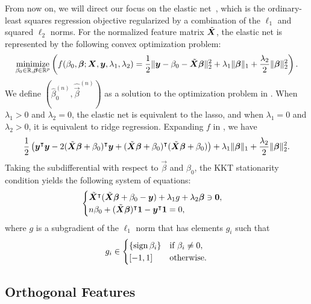 From now on, we will direct our focus on the elastic net~\citep{zou2005}, which is the
ordinary-least squares regression objective regularized by a combination of the \(\ell_1\)
and squared \(\ell_2\) norms. For the normalized feature matrix \(\tilde{\boldsymbol{X}}\), the
elastic net is represented by the following convex optimization problem:
\begin{equation}
  \label{eq:elastic-net}
  \operatorname*{minimize}_{\beta_0 \in \mathbb{R},\boldsymbol{\beta} \in \mathbb{R}^p}\left( f(\beta_0, \boldsymbol{\beta};\boldsymbol{X},\boldsymbol{y},\lambda_1,\lambda_2)=\frac{1}{2} \lVert \boldsymbol y - \beta_0 - \tilde{\boldsymbol{X}}\boldsymbol{\beta} \rVert^2_2  + \lambda_1 \lVert \boldsymbol\beta \rVert_1 + \frac{\lambda_2}{2}\lVert \boldsymbol \beta \rVert_2^2\right).
\end{equation}
We define \((\hat{\beta}_0^{(n)}, \hat{\vec{\beta}}^{(n)})\) as a solution to the optimization problem in .
When \(\lambda_1 > 0\) and \(\lambda_2 = 0\), the elastic net is equivalent to the lasso, and when \(\lambda_1 = 0\) and \(\lambda_2 > 0\), it is equivalent to ridge regression. Expanding \(f\) in , we have
\[
  \begin{aligned}
    \frac{1}{2}\left( \boldsymbol y^\intercal \boldsymbol y - 2(\tilde{\boldsymbol{X}}\boldsymbol{\beta} + \beta_0)^\intercal\boldsymbol{y} + (\tilde{\boldsymbol{X}}\boldsymbol{\beta} + \beta_0)^\intercal(\tilde{\boldsymbol{X}}\boldsymbol{\beta} + \beta_0)\right) + \lambda_1 \lVert \boldsymbol\beta \rVert_1 + \frac{\lambda_2}{2}\lVert \boldsymbol \beta \rVert_2^2.
  \end{aligned}
\]
Taking the subdifferential with respect to \(\vec{\beta}\) and \(\beta_0\), the KKT
stationarity condition yields the following system of equations:
\begin{equation}
  \label{eq:kkt-elasticnet}
  \begin{cases}
    \tilde{\boldsymbol{X}}^\intercal(\tilde{\boldsymbol{X}}\boldsymbol{\beta} + \beta_0 - \boldsymbol{y}) + \lambda_1 g + \lambda_2 \boldsymbol\beta \ni \boldsymbol{0}, \\
    n \beta_0 + (\tilde{\boldsymbol{X}}\boldsymbol{\beta})^\intercal \boldsymbol{1} - \boldsymbol{y}^\intercal \boldsymbol{1} = 0,
  \end{cases}
\end{equation}
where \(g\) is a subgradient of the \(\ell_1\) norm that has elements \(g_i\) such that
\[
  g_i \in
  \begin{cases}
    \{\operatorname{sign}{\beta_i}\} & \text{if } \beta_i \neq 0, \\
    [-1, 1]            & \text{otherwise}.
  \end{cases}
\]

\subsection{Orthogonal Features}

